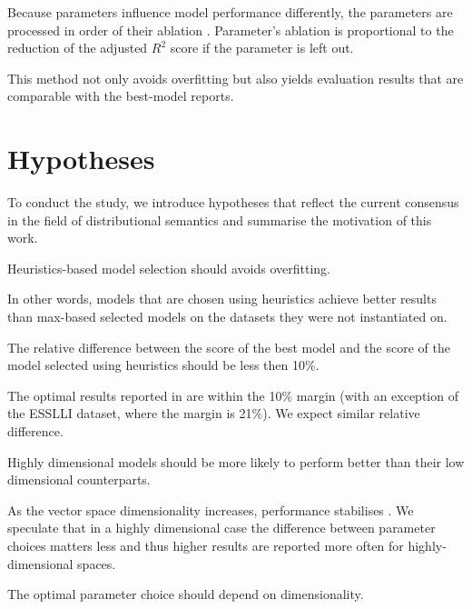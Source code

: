 Because parameters influence model performance differently, the parameters are processed in order of their ablation \cite{lapesa2014large}. Parameter's ablation is proportional to the reduction of the adjusted $R^2$ score if the parameter is left out.

This method not only avoids overfitting but also yields evaluation results that are comparable with the best-model reports.

\section{Hypotheses}
\label{sec:hypotheses}

To conduct the study, we introduce hypotheses that reflect the current consensus in the field of distributional semantics and summarise the motivation of this work.

\begin{hyp}
\label{hyp:overfitting}
Heuristics-based model selection should avoids overfitting.
\end{hyp}

In other words, models that are chosen using heuristics achieve better results than max-based selected models on the datasets they were not instantiated on.

\begin{hyp}
\label{hyp:10percent}
The relative difference between the score of the best model and the score of the model selected using heuristics should be less then 10\%.
\end{hyp}

The optimal results reported in  are within the 10\% margin (with an exception of the ESSLLI dataset, where the margin is 21\%). We expect similar relative difference.

\begin{hyp}
\label{hyp:var}
Highly dimensional models should be more likely to perform better than their low dimensional counterparts.
\end{hyp}

As the vector space dimensionality increases, performance stabilises \cite{kiela-clark:2014:CVSC,BullinariaLevy2012,lapesa2014large}. We speculate that in a highly dimensional case the difference between parameter choices matters less and thus higher results are reported more often for highly-dimensional spaces.

\begin{hyp}
\label{hyp:dimen}
The optimal parameter choice should depend on dimensionality.
\end{hyp}

